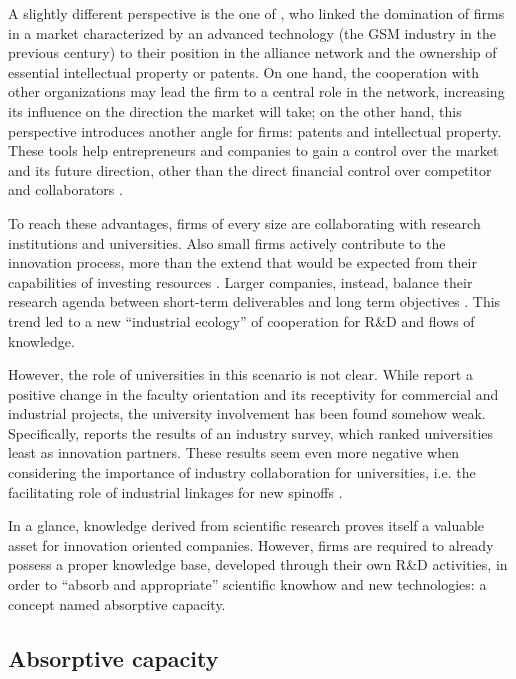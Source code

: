 A slightly different perspective is the one of \citet{Bekkers2002}, who linked the domination of firms in a market characterized by an advanced technology (the GSM industry in the previous century) to their position in the alliance network and the ownership of essential intellectual property or patents. On one hand, the cooperation with other organizations may lead the firm to a central role in the network, increasing its influence on the direction the market will take; on the other hand, this perspective introduces another angle for firms: patents and intellectual property. These tools help entrepreneurs and companies to gain a control over the market and its future direction, other than the direct financial control over competitor and collaborators \citep{Siegel2003a}. 

To reach these advantages, firms of every size are collaborating with research institutions and universities. Also small firms actively contribute to the innovation process, more than the extend that would be expected from their capabilities of investing resources \citep{Audretsch2005}. Larger companies, instead, balance their research agenda between short-term deliverables and long term objectives \citep{Tijssen2006}. This trend led to a new \enquote{industrial ecology} of cooperation for R\&D and flows of knowledge.

However, the role of universities in this scenario is not clear. While \citet{Thursby2002} report a positive change in the faculty orientation and its receptivity for commercial and industrial projects, the university involvement has been found somehow weak. Specifically,\citet{Yusuf2008} reports the results of an industry survey, which ranked universities least as innovation partners. These results seem even more negative when considering the importance of industry collaboration for universities, i.e. the facilitating role of industrial linkages for new spinoffs \citep{OShea2005}.

In a glance, knowledge derived from scientific research proves itself a valuable asset for innovation oriented companies. However, firms are required to already possess a proper knowledge base, developed through their own R\&D activities, in order to \enquote{absorb and appropriate} scientific knowhow and new technologies: a concept named absorptive capacity.

\subsection{Absorptive capacity}


